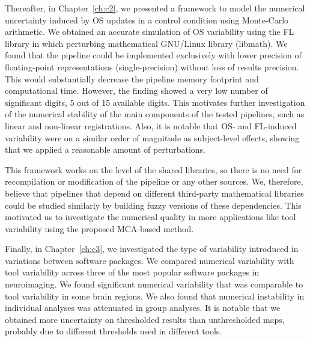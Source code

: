 Thereafter, in Chapter~\ref{ch:c2}, we presented a framework to model the numerical uncertainty induced by OS updates in a control condition using Monte-Carlo arithmetic. 
We obtained an accurate simulation of OS variability using the FL library in which perturbing mathematical GNU/Linux library (libmath).
We found that the pipeline could be implemented exclusively with lower precision of floating-point representations (single-precision)
without loss of results precision. This would substantially decrease the pipeline memory footprint and computational time.
However, the finding showed a very low number of significant digits, 5 out of 15 available digits.
This motivates further investigation of the numerical stability of the main components of the tested pipelines, such as linear and non-linear registrations.
Also, it is notable that OS- and FL-induced variability were on a similar order of magnitude as subject-level effects,
showing that we applied a reasonable amount of perturbations.

This framework works on the level of the shared libraries, so there is no need for recompilation or modification
of the pipeline or any other sources.
We, therefore, believe that pipelines that depend
on different third-party mathematical libraries could be studied similarly by building fuzzy
versions of these dependencies. This motivated us to investigate the numerical quality in
more applications like tool variability using the proposed MCA-based method.

Finally, in Chapter~\ref{ch:c3}, we investigated the type of variability introduced in variations between software packages.
We compared numerical variability with tool variability across three of the most popular software packages in neuroimaging.
We found significant numerical variability that was comparable to tool variability in some brain regions.
We also found that numerical instability in individual analyses was attenuated in group analyses.
It is notable that we obtained more uncertainty on thresholded results than unthresholded maps, probably due to
different thresholds used in different tools.


